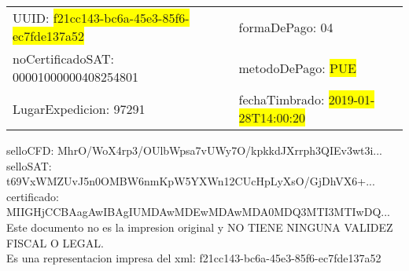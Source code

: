 \documentclass{article}
\begin{document}
\begin{tabular}{p{11cm}p{1cm}p{8cm}}
\bigskip
UUID: \colorbox{yellow}{ f21cc143-bc6a-45e3-85f6-ec7fde137a52 } & & formaDePago: 04\\

noCertificadoSAT: 00001000000408254801 & & metodoDePago: \colorbox{yellow}{ PUE }\\

LugarExpedicion: 97291 & & fechaTimbrado: \colorbox{yellow}{ 2019-01-28T14:00:20 } \\
\end{tabular}

\bigskip
selloCFD: MhrO/WoX4rp3/OUlbWpsa7vUWy7O/kpkkdJXrrph3QIEv3wt3i... \\
selloSAT: t69VxWMZUvJ5n0OMBW6nmKpW5YXWn12CUcHpLyXsO/GjDhVX6+... \\

certificado: MIIGHjCCBAagAwIBAgIUMDAwMDEwMDAwMDA0MDQ3MTI3MTIwDQ...\bigskip\bigskip\bigskip\bigskip\bigskip\bigskip
\\Este documento no es la impresion original y NO TIENE NINGUNA VALIDEZ FISCAL O LEGAL. \\
 Es una representacion impresa del xml:  f21cc143-bc6a-45e3-85f6-ec7fde137a52 \\
\end{document}
